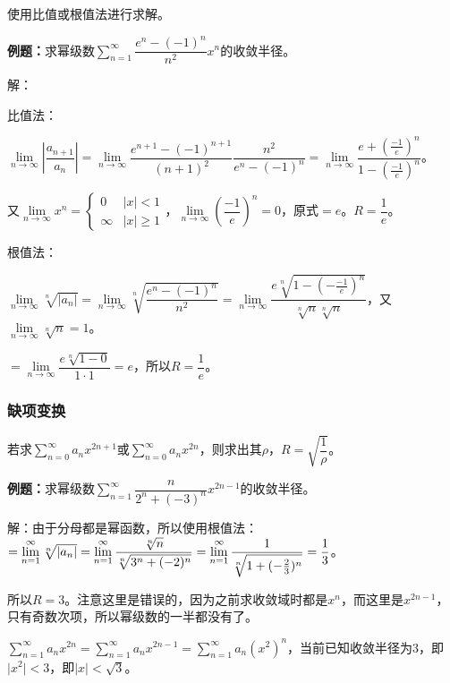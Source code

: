 \documentclass[UTF8, 12pt]{ctexart}
\begin{document}
使用比值或根值法进行求解。

\textbf{例题：}求幂级数$\sum\limits_{n=1}^\infty\dfrac{e^n-(-1)^n}{n^2}x^n$的收敛半径。

解：

比值法：

$\lim\limits_{n\to\infty}\left\vert\dfrac{a_{n+1}}{a_n}\right\vert=\lim\limits_{n\to\infty}\dfrac{e^{n+1}-(-1)^{n+1}}{(n+1)^2}\dfrac{n^2}{e^n-(-1)^n}=\lim\limits_{n\to\infty}\dfrac{e+(\frac{-1}{e})^n}{1-(\frac{-1}{e})^n}$。

又$\lim\limits_{n\to\infty}x^n=\left\{\begin{array}{ll}
    0 & \vert x\vert<1 \\
    \infty & \vert x\vert\geqslant1
\end{array}\right.$，$\lim\limits_{n\to\infty}\left(\dfrac{-1}{e}\right)^n=0$，原式$=e$。$R=\dfrac{1}{e}$。

根值法：

$\lim\limits_{n\to\infty}\sqrt[n]{\vert a_n\vert}=\lim\limits_{n\to\infty}\sqrt[n]{\dfrac{e^n-(-1)^n}{n^2}}=\lim\limits_{n\to\infty}\dfrac{e\sqrt[n]{1-(-\frac{-1}{e})^n}}{\sqrt[n]{n}\sqrt[n]{n}}$，又$\lim\limits_{n\to\infty}\sqrt[n]{n}=1$。

$=\lim\limits_{n\to\infty}\dfrac{e\sqrt[n]{1-0}}{1\cdot1}=e$，所以$R=\dfrac{1}{e}$。

\subsubsection{缺项变换}

若求$\sum\limits_{n=0}^\infty a_nx^{2n+1}$或$\sum\limits_{n=0}^\infty a_nx^{2n}$，则求出其$\rho$，$R=\sqrt{\dfrac{1}{\rho}}$。

\textbf{例题：}求幂级数$\sum\limits_{n=1}^\infty\dfrac{n}{2^n+(-3)^n}x^{2n-1}$的收敛半径。

解：由于分母都是幂函数，所以使用根值法：$=\lim\limits_{n=1}^\infty\sqrt[n]{\vert a_n\vert}=\lim\limits_{n=1}^\infty\dfrac{\sqrt[n]{n}}{\sqrt[n]{3^n+(-2)^n}}\\=\lim\limits_{n=1}^\infty\dfrac{1}{\sqrt[n]{1+(-\frac{2}{3})^n}}=\dfrac{1}{3}$。

所以$R=3$。注意这里是错误的，因为之前求收敛域时都是$x^n$，而这里是$x^{2n-1}$，只有奇数次项，所以幂级数的一半都没有了。

$\sum\limits_{n=1}^\infty a_nx^{2n}=\sum\limits_{n=1}^\infty a_nx^{2n-1}=\sum\limits_{n=1}^\infty a_n(x^2)^n$，当前已知收敛半径为$3$，即$\vert x^2\vert<3$，即$\vert x\vert<\sqrt{3}$。
\end{document}
